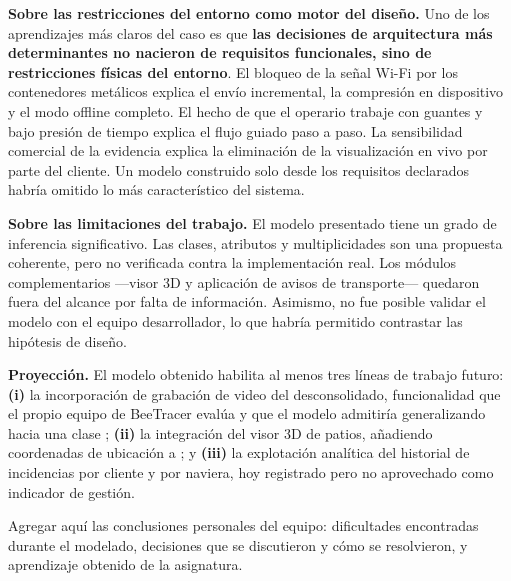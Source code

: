 \textbf{Sobre las restricciones del entorno como motor del diseño.} Uno de los aprendizajes más
claros del caso es que \textbf{las decisiones de arquitectura más determinantes no nacieron de
requisitos funcionales, sino de restricciones físicas del entorno}. El bloqueo de la señal Wi-Fi
por los contenedores metálicos explica el envío incremental, la compresión en dispositivo y el modo
offline completo. El hecho de que el operario trabaje con guantes y bajo presión de tiempo explica
el flujo guiado paso a paso. La sensibilidad comercial de la evidencia explica la eliminación de la
visualización en vivo por parte del cliente. Un modelo construido solo desde los requisitos
declarados habría omitido lo más característico del sistema.

\textbf{Sobre las limitaciones del trabajo.} El modelo presentado tiene un grado de inferencia
significativo. Las clases, atributos y multiplicidades son una propuesta coherente, pero no
verificada contra la implementación real. Los módulos complementarios ---visor 3D y aplicación de
avisos de transporte--- quedaron fuera del alcance por falta de información. Asimismo, no fue
posible validar el modelo con el equipo desarrollador, lo que habría permitido contrastar las
hipótesis de diseño.

\textbf{Proyección.} El modelo obtenido habilita al menos tres líneas de trabajo futuro:
\textbf{(i)} la incorporación de grabación de video del desconsolidado, funcionalidad que el propio
equipo de BeeTracer evalúa y que el modelo admitiría generalizando  hacia una
clase ; \textbf{(ii)} la integración del visor 3D de patios, añadiendo coordenadas
de ubicación a ; y \textbf{(iii)} la explotación analítica del historial de
incidencias por cliente y por naviera, hoy registrado pero no aprovechado como indicador de
gestión.

\begin{pendiente}
Agregar aquí las conclusiones personales del equipo: dificultades encontradas durante el modelado,
decisiones que se discutieron y cómo se resolvieron, y aprendizaje obtenido de la asignatura.
\end{pendiente}

